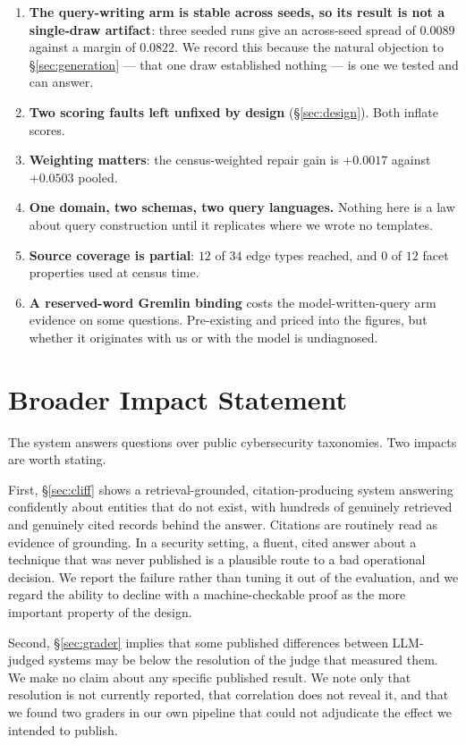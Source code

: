 \documentclass{article}
\newcommand{\expref}[1]{\iftoggle{trace}{\,{\scriptsize\textcolor{gray}{\texttt{[#1]}}}}{}}
\begin{document}
\begin{enumerate}
\item \textbf{The query-writing arm is stable across seeds, so its result is not
      a single-draw artifact}: three seeded runs give an across-seed spread of
      $0.0089$ against a margin of $0.0822$.\expref{EXP-2026-09-009} We record
      this because the natural objection to \S\ref{sec:generation} — that one
      draw established nothing — is one we tested and can answer.
\item \textbf{Two scoring faults left unfixed by design} (\S\ref{sec:design}).
      Both inflate scores.
\item \textbf{Weighting matters}: the census-weighted repair gain is $+0.0017$
      against $+0.0503$ pooled.
\item \textbf{One domain, two schemas, two query languages.} Nothing here is a
      law about query construction until it replicates where we wrote no
      templates.
\item \textbf{Source coverage is partial}: $12$ of $34$ edge types reached, and
      $0$ of $12$ facet properties used at census
      time.\expref{EXP-2026-09-001}
\item \textbf{A reserved-word Gremlin binding} costs the model-written-query arm
      evidence on some questions. Pre-existing and priced into the figures, but
      whether it originates with us or with the model is undiagnosed.
\end{enumerate}

\section*{Broader Impact Statement}

The system answers questions over public cybersecurity taxonomies. Two impacts
are worth stating.

First, \S\ref{sec:cliff} shows a retrieval-grounded, citation-producing system
answering confidently about entities that do not exist, with hundreds of
genuinely retrieved and genuinely cited records behind the answer. Citations are
routinely read as evidence of grounding. In a security setting, a fluent, cited
answer about a technique that was never published is a plausible route to a bad
operational decision. We report the failure rather than tuning it out of the
evaluation, and we regard the ability to decline with a machine-checkable proof
as the more important property of the design.

Second, \S\ref{sec:grader} implies that some published differences between
LLM-judged systems may be below the resolution of the judge that measured them.
We make no claim about any specific published result. We note only that
resolution is not currently reported, that correlation does not reveal it, and
that we found two graders in our own pipeline that could not adjudicate the
effect we intended to publish.
\end{document}
